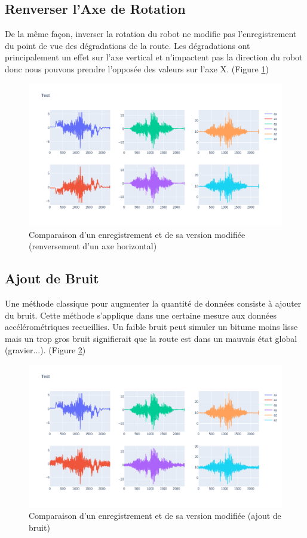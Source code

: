 \subsection{Renverser l'Axe de Rotation}
De la même façon, inverser la rotation du robot ne modifie pas l'enregistrement du point de vue des dégradations de la route. Les dégradations ont principalement un effet sur l'axe vertical et n'impactent pas la direction du robot donc nous pouvons prendre l'opposée des valeurs sur l'axe X. (Figure \ref{data_augmentation_2})

\begin{figure}
    \center
    \includegraphics[scale=0.5]{img/inverted_data.png}
    \caption{Comparaison d'un enregistrement et de sa version modifiée (renversement d'un axe horizontal)}
    \label{data_augmentation_2}
\end{figure}

\subsection{Ajout de Bruit}
Une méthode classique pour augmenter la quantité de données consiste à ajouter du bruit. Cette méthode s'applique dans une certaine mesure aux données accélérométriques recueillies. Un faible bruit peut simuler un bitume moins lisse mais un trop gros bruit signifierait que la route est dans un mauvais état global (gravier...). (Figure \ref{data_augmentation_3})

\begin{figure}
    \center
    \includegraphics[scale=0.5]{img/noisy_data.png}
    \caption{Comparaison d'un enregistrement et de sa version modifiée (ajout de bruit)}
    \label{data_augmentation_3}
\end{figure}


